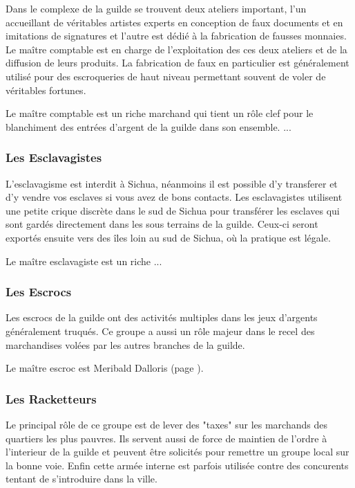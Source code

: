 Dans le complexe de la guilde se trouvent deux ateliers important, l'un
accueillant de véritables artistes experts en conception de faux documents
et en imitations de signatures et l'autre est dédié à la fabrication de fausses 
monnaies. Le maître comptable est en charge de l'exploitation des ces deux
ateliers et de la diffusion de leurs produits. La fabrication de faux en
particulier est généralement utilisé pour des escroqueries de haut niveau
permettant souvent de voler de véritables fortunes.

Le maître comptable est un riche marchand qui tient un rôle clef pour
le blanchiment des entrées d'argent de la guilde dans son ensemble.
...

\subsubsection{Les Esclavagistes}

L'esclavagisme est interdit à Sichua, néanmoins il est possible d'y transferer
et d'y vendre vos esclaves si vous avez de bons contacts. Les esclavagistes 
utilisent une petite crique discrète dans le sud de Sichua pour transférer
les esclaves qui sont gardés directement dans les sous terrains de la guilde.
Ceux-ci seront exportés ensuite vers des îles loin au sud de Sichua, où la
pratique est légale. 

Le maître esclavagiste est un riche ...

\subsubsection{Les Escrocs}

Les escrocs de la guilde ont des activités multiples dans les jeux d'argents
généralement truqués. Ce groupe a aussi un rôle majeur dans le recel des 
marchandises volées par les autres branches de la guilde.

Le maître escroc est Meribald Dalloris (page \pageref{MeribaldDalloris}).

\subsubsection{Les Racketteurs}

Le principal rôle de ce groupe est de lever des "taxes" sur les marchands 
des quartiers les plus pauvres. Ils servent aussi de force de maintien de 
l'ordre à l'interieur de la guilde et peuvent être solicités pour remettre 
un groupe local sur la bonne voie. Enfin cette armée interne est parfois 
utilisée contre des concurents tentant de s'introduire dans la ville. 


